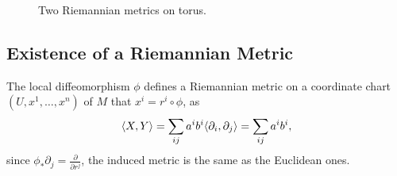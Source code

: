\begin{figure}[htp]
    \centering
    \caption{Two Riemannian metrics on torus.}
\end{figure}
\subsection{Existence of a Riemannian Metric}
The local diffeomorphism $\phi$ defines a Riemannian metric on 
a coordinate chart $(U, x^1,\dots, x^n)$ of $M$ that $x^i=r^i \circ \phi$, 
as
\begin{equation}
    \langle X, Y \rangle=\sum_{ij}a^i b^i\langle \partial_i, \partial_j \rangle
    =\sum_{ij}a^i b^i,
    \label{eq. induced inner}
\end{equation}
since $\phi_* \partial_j=\frac{\partial}{\partial r^j}$, the induced metric 
is the same as the Euclidean ones.


